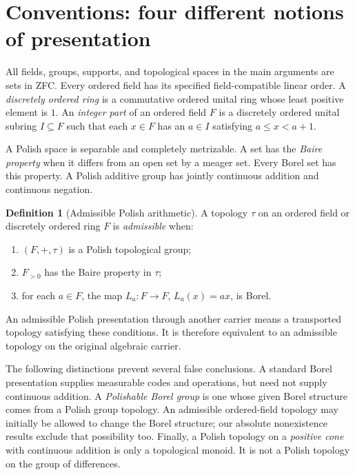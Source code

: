 \documentclass[11pt]{article}
\numberwithin{equation}{section}
\theoremstyle{definition}
\newtheorem{definition}[definition]{Definition}
\theoremstyle{remark}
\begin{document}
\section{Conventions: four different notions of presentation}
\label{pma:ser:sec:conventions}

All fields, groups, supports, and topological spaces in the main arguments are
sets in ZFC. Every ordered field has its specified field-compatible linear
order. A \emph{discretely ordered ring} is a commutative ordered unital ring
whose least positive element is $1$. An \emph{integer part} of an ordered
field $F$ is a discretely ordered unital subring $I\subseteq F$ such that each
$x\in F$ has an $a\in I$ satisfying $a\leq x<a+1$.

A Polish space is separable and completely metrizable. A set has the
\emph{Baire property} when it differs from an open set by a meager set.
Every Borel set has this property. A Polish additive group has jointly
continuous addition and continuous negation.

\begin{definition}[Admissible Polish arithmetic]\label{pma:ser:def:admissible}
A topology $\tau$ on an ordered field or discretely ordered ring $F$ is
\emph{admissible} when:
\begin{enumerate}[label=(\roman*)]
\item $(F,+,\tau)$ is a Polish topological group;
\item $F_{>0}$ has the Baire property in $\tau$;
\item for each $a\in F$, the map $L_a:F\to F$, $L_a(x)=ax$, is Borel.
\end{enumerate}
An admissible Polish presentation through another carrier means a transported
topology satisfying these conditions. It is therefore equivalent to an
admissible topology on the original algebraic carrier.
\end{definition}

The following distinctions prevent several false conclusions.
A standard Borel presentation supplies measurable codes and operations, but
need not supply continuous addition. A \emph{Polishable Borel group} is one
whose given Borel structure comes from a Polish group topology. An admissible
ordered-field topology may initially be allowed to change the Borel structure;
our absolute nonexistence results exclude that possibility too. Finally, a
Polish topology on a \emph{positive cone} with continuous addition is only a
topological monoid. It is not a Polish topology on the group of differences.
\end{document}
